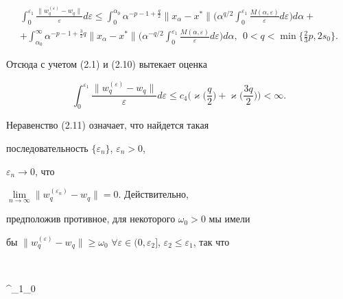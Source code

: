 \begin{multline*}


\int^{\varepsilon_1}_0 \frac{\|w^{(\varepsilon)}_q-w_q\|}


{\varepsilon}d\varepsilon \le \int^{\alpha_0}_0


\alpha^{-p-1+\frac{q}{2}}\|x_\alpha-x^*\|\bigg(\alpha^{q/2}


\int^{\varepsilon_1}_0


\frac{M(\alpha,\varepsilon)}{\varepsilon}d\varepsilon\bigg)d\alpha+ \\


%


+\int^\infty_{\alpha_0}\alpha^{-p-1+\frac{3}{2}q}


\|x_\alpha-x^*\|\bigg(\alpha^{-q/2}\int^{\varepsilon_1}_0


\frac{M(\alpha,\varepsilon)}{\varepsilon}d\varepsilon\bigg)


d\alpha,\ \ 0<q<\min\{\tfrac{2}{3}p,2s_0\}.


\end{multline*}


Отсюда с учетом (2.1) и (2.10) вытекает оценка


\begin{equation}


\int^{\varepsilon_1}_0


\frac{\|w^{(\varepsilon)}_q-w_q\|}


{\varepsilon}d\varepsilon\le c_4\bigg(\varkappa


\bigg(\frac{q}{2} \bigg)+\varkappa \bigg(\frac{3q}{2} \bigg)


\bigg)<\infty.


\end{equation}


Неравенство (2.11) означает, что найдется такая 


последовательность $\{\varepsilon_n\}$, $\varepsilon_n>0$, 


$\varepsilon_n\to0$, что 


$\lim\limits_{n\to\infty}\|w^{(\varepsilon_n)}_q-w_q\|=0$. Действительно, 


предположив противное, для некоторого $\omega_0>0$ мы имели


бы $\|w^{(\varepsilon)}_q-w_q\|\ge\omega_0$\; $\forall\varepsilon 


\in(0,\varepsilon_2]$, $\varepsilon_2\le\varepsilon_1$, так что


$$


\int^{\varepsilon_1}_0


